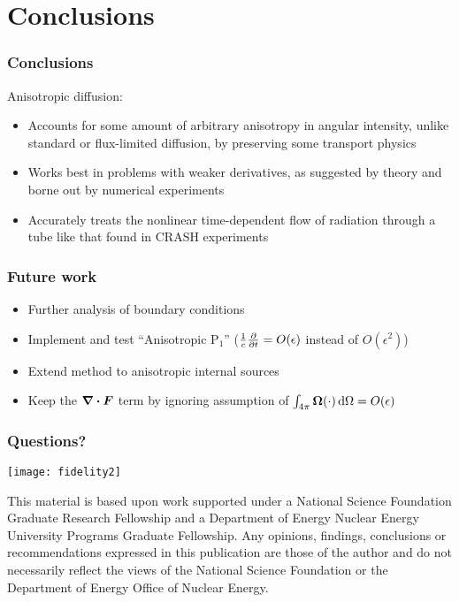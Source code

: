 \documentclass{beamer}
\begin{document}
\section{Conclusions}
\begin{frame}
  \frametitle{Conclusions}
  Anisotropic diffusion:
  \begin{itemize}
    \item Accounts for some amount of arbitrary anisotropy in
      angular intensity, unlike standard or flux-limited diffusion, by
      preserving some transport physics
    \item Works best in problems with weaker derivatives, as suggested by
      theory and borne out by numerical experiments
    \item Accurately treats the nonlinear time-dependent flow of radiation
      through a tube like that found in CRASH experiments
  \end{itemize}
\end{frame}
\begin{frame}
  \frametitle{Future work}
  \begin{itemize}
    \item Further analysis of boundary conditions
    \item Implement and test ``Anisotropic P$_1$''
      ($\frac1c\frac{\partial }{\partial t}=O(\epsilon)$ instead of $O(\epsilon^2)$)
    \item Extend method to anisotropic internal sources
    \item Keep the $\bm{\nabla} \bm{\cdot} \bm{F}$ term by ignoring assumption of
      $\int_{4\pi} \bm{\Omega} (\cdot) \mathop{}\!\mathrm{d}\Omega = O(\epsilon)$ 
  \end{itemize}
\end{frame}
\appendix
\begin{frame}
  \frametitle{Questions?}
  \begin{center}
    \texttt{[image: fidelity2]}
  \end{center}
{\setlength{\baselineskip}{-\baselineskip} \tiny 
This material is based upon work supported under a National Science Foundation
Graduate Research Fellowship and a Department of Energy Nuclear Energy
University Programs Graduate Fellowship. Any opinions, findings, conclusions or
recommendations expressed in this publication are those of the author and do
not necessarily reflect the views of the National Science Foundation or the
Department of Energy Office of Nuclear Energy.\par}
\end{frame}
\end{document}
